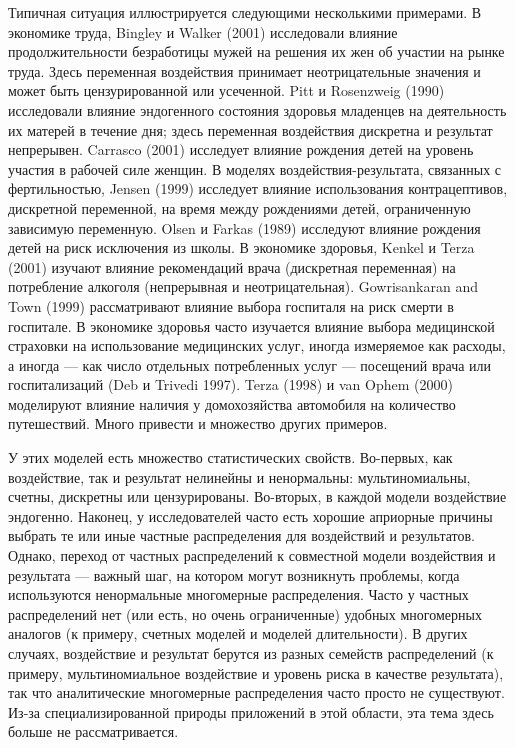 Типичная ситуация иллюстрируется следующими несколькими примерами. В экономике труда, Bingley и Walker (2001) исследовали влияние продолжительности безработицы мужей на решения их жен об участии на рынке труда. Здесь переменная воздействия принимает неотрицательные значения и может быть цензурированной или усеченной. Pitt и Rosenzweig (1990) исследовали влияние эндогенного состояния здоровья младенцев на деятельность их матерей в течение дня; здесь переменная воздействия дискретна и результат непрерывен. Carrasco (2001) исследует влияние рождения детей на уровень участия в рабочей силе женщин. В моделях воздействия-результата, связанных с фертильностью, Jensen (1999) исследует влияние использования контрацептивов, дискретной переменной, на время между рождениями детей, ограниченную зависимую переменную. Olsen и Farkas (1989) исследуют влияние рождения детей на риск исключения из школы. В экономике здоровья, Kenkel и Terza (2001) изучают влияние рекомендаций врача (дискретная переменная) на потребление алкоголя (непрерывная и неотрицательная). Gowrisankaran and Town (1999) рассматривают влияние выбора госпиталя на риск смерти в госпитале. В экономике здоровья часто изучается влияние выбора медицинской страховки  на использование медицинских услуг, иногда измеряемое как расходы, а иногда --- как число отдельных потребленных услуг --- посещений врача или госпитализаций (Deb и Trivedi 1997). Terza (1998) и van Ophem (2000) моделируют влияние наличия у домохозяйства автомобиля на количество путешествий. Много привести и множество других примеров. 

У этих моделей есть множество статистических свойств. Во-первых, как воздействие, так и результат нелинейны и ненормальны: мультиномиальны, счетны, дискретны или цензурированы. Во-вторых, в каждой модели воздействие эндогенно. Наконец, у исследователей часто есть хорошие априорные причины выбрать те или иные частные распределения для воздействий и результатов. Однако, переход от частных распределений к совместной модели воздействия и результата --- важный шаг, на котором могут возникнуть проблемы, когда используются ненормальные многомерные распределения. Часто у частных распределений нет (или есть, но очень ограниченные) удобных многомерных аналогов (к примеру, счетных моделей и моделей длительности). В других случаях, воздействие и результат берутся из разных семейств распределений (к примеру, мультиномиальное воздействие и уровень риска в качестве результата), так что аналитические многомерные распределения часто просто не существуют. Из-за специализированной природы приложений в этой области, эта тема здесь больше не рассматривается. 

